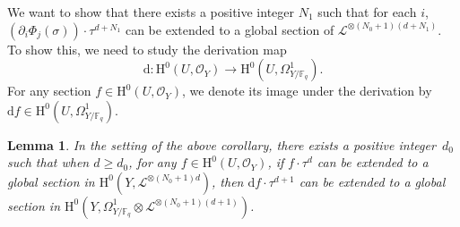 \documentclass[JEP,XML,SOM,Unicode,published]{cedram}
\theoremstyle{plain}
\newtheorem{lem}[thm]{Lemma}
\theoremstyle{definition}
\newcommand{\ho}{\mathrm{H}}
\newcommand{\li}{\mathcal{L}}
\newcommand{\F}{\mathbb{F}}
\begin{document}
We want to show that there exists a positive integer $N_1$ such that for each $i$, $\left(\partial_i \Phi_j(\sigma) \right)\cdot \tau^{d+N_1}$ can be extended to a global section of $\li^{\otimes (N_0+1)(d+N_1)}$. To show this, we need to study the derivation map\vspace*{-3pt}
\[
\mathrm{d}: \ho^0(U, \mathcal{O}_Y)\to \ho^0(U, \Omega_{Y/\F_q}^1).
\]
For any section $f\in \ho^0(U, \mathcal{O}_Y)$, we denote its image under the derivation by $\mathrm{d}f\in \ho^0(U, \Omega_{Y/\F_q}^1)$.
\begin{lem}\label{preextend}
In the setting of the above corollary, there exists a positive integer~$d_0$ such that when $d\geq d_0$, for any $f\in \ho^0(U, \mathcal{O}_Y)$, if $f\cdot \tau^d$ can be extended to a global section in $ \ho^0(Y, \li^{\otimes (N_0+1)d})$, then $\mathrm{d} f\cdot \tau^{d+1}$ can be extended to a global section in $\ho^0(Y, \Omega_{Y/\F_q}^1\otimes \li^{\otimes (N_0+1)(d+1)})$.
\end{lem}
\end{document}
